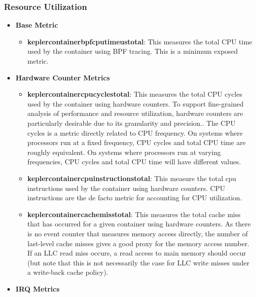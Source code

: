 \subsubsection{Resource Utilization}
\begin{itemize}
    \item \textbf{Base Metric}
    \begin{itemize}
        \item \textbf{kepler\textunderscore container\textunderscore bpf\textunderscore cpu\textunderscore time\textunderscore us\textunderscore total}: This measures the total CPU time used by the container using BPF tracing. This is a minimum exposed metric.
    \end{itemize}
    \item \textbf{Hardware Counter Metrics}
    \begin{itemize}
        \item \textbf{kepler\textunderscore container\textunderscore cpu\textunderscore cycles\textunderscore total}: This measures the total CPU cycles used by the container using hardware counters. To support fine-grained analysis of performance and resource utilization, hardware counters are particularly desirable due to its granularity and precision..
        The CPU cycles is a metric directly related to CPU frequency. On systems where processors run at a fixed frequency, CPU cycles and total CPU time are roughly equivalent. On systems where processors run at varying frequencies, CPU cycles and total CPU time will have different values.
        \item \textbf{kepler\textunderscore container\textunderscore cpu\textunderscore instructions\textunderscore total}: This measure the total cpu instructions used by the container using hardware counters.
        CPU instructions are the de facto metric for accounting for CPU utilization.
        \item \textbf{kepler\textunderscore container\textunderscore cache\textunderscore miss\textunderscore total}: This measures the total cache miss that has occurred for a given container using hardware counters.
        As there is no event counter that measures memory access directly, the number of last-level cache misses gives a good proxy for the memory access number. If an LLC read miss occurs, a read access to main memory should occur (but note that this is not necessarily the case for LLC write misses under a write-back cache policy).
    \end{itemize}
    \item \textbf{IRQ Metrics}

\end{itemize}
